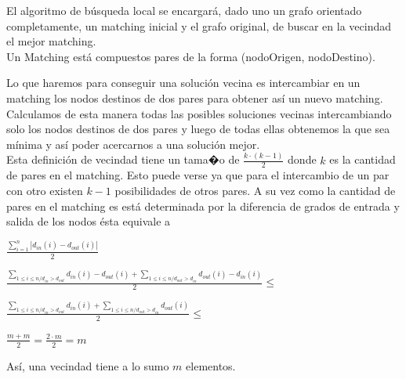 \documentclass[11pt, a4paper, spanish]{article}
\begin{document}
	El algoritmo de b\'usqueda local se encargar\'a, dado uno un grafo orientado completamente, un matching inicial y el grafo original, de buscar en la vecindad el mejor matching.\\

Un Matching est\'a compuestos pares de la forma (nodoOrigen, nodoDestino).

Lo que haremos para conseguir una soluci\'on vecina es intercambiar en un matching los nodos destinos de dos pares para obtener as\'i un nuevo matching. Calculamos de esta manera todas las posibles soluciones vecinas intercambiando solo los nodos destinos de dos pares y luego de todas ellas obtenemos la que sea m\'inima y as\'i poder acercarnos a una soluci\'on mejor.\\

Esta definici\'on de vecindad tiene un tama�o de $\frac{k \cdot (k-1)}{2}$ donde $k$ es la cantidad de pares en el matching. Esto puede verse ya que para el intercambio de un par con otro existen $k-1$ posibilidades de otros pares. A su vez como la cantidad de pares en el matching es est\'a determinada por la diferencia de grados de entrada y salida de los nodos \'esta equivale a\\


\begin{center}
	$\displaystyle{\frac{\displaystyle\sum_{i=1}^{n}{|d_{in}(i)-d_{out}(i)|}}{2}}$\\
\end{center}

\begin{center}
	$\displaystyle{\frac{\displaystyle\sum_{1 \leq i \leq n / d_{in} > d_{out}}^{}{d_{in}(i)-d_{out}(i)} + \displaystyle\sum_{1 \leq i \leq n / d_{out} > d_{in}}^{}{d_{out}(i)-d_{in}(i)} }{2}} \leq$\\
\end{center}

\begin{center}
	$\displaystyle{\frac{\displaystyle\sum_{1 \leq i \leq n / d_{in} > d_{out}}^{}{d_{in}(i)} + \displaystyle\sum_{1 \leq i \leq n / d_{out} > d_{in}}^{}{d_{out}(i)} }{2}} \leq $\\
\end{center}

\begin{center}
	$\displaystyle{\frac{m + m}{2} = \frac{2 \cdot m}{2} = m} $\\
\end{center}

As\'i, una vecindad tiene a lo sumo $m$ elementos.\\
\end{document}
